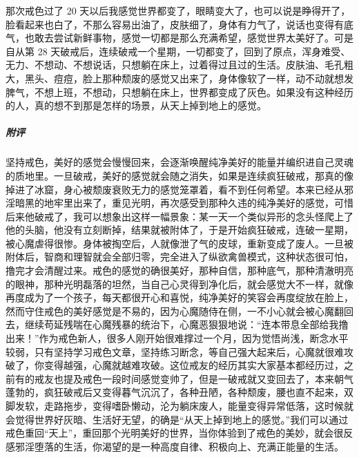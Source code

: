 \begin{case}
    那次戒色过了 20 天以后我感觉世界都变了，眼睛变大了，也可以说是睁得开了，脸看起来也白了，不那么容易出油了，皮肤细了，身体有力气了，说话也变得有底气，也敢去尝试新鲜事物，感觉一切都是那么充满希望，感觉世界太美好了。可是自从第 28 天破戒后，连续破戒一个星期，一切都变了，回到了原点，浑身难受、无力、不想动、不想说话，只想躺在床上，过着得过且过的生活。皮肤油、毛孔粗大，黑头、痘痘，脸上那种颓废的感觉又出来了，身体像软了一样，动不动就想发脾气，不想上班，不想动，只想躺在床上，世界都变成了灰色。如果没有这种经历的人，真的想不到那是怎样的场景，从天上掉到地上的感觉。
    \subparagraph{附评} 坚持戒色，美好的感觉会慢慢回来，会逐渐唤醒纯净美好的能量并编织进自己灵魂的质地里。一旦破戒，美好的感觉就会随之消失，如果是连续疯狂破戒，那真的像掉进了冰窟，身心被颓废衰败无力的感觉笼罩着，看不到任何希望。本来已经从邪淫暗黑的地牢里出来了，重见光明，再次感受到那种久违的纯净美好的感觉，可惜后来他破戒了，我可以想象出这样一幅景象：某一天一个类似异形的念头怪爬上了他的头脑，他没有立刻断掉，结果就被附体了，于是开始疯狂破戒，连破一星期，被心魔虐得很惨。身体被掏空后，人就像泄了气的皮球，重新变成了废人。一旦被附体后，智商和理智就会全部归零，完全进入了纵欲禽兽模式，这种状态很可怕，撸完才会清醒过来。戒色的感觉的确很美好，那种自信，那种底气，那种清澈明亮的眼神，那种光明磊落的坦然，当自己心灵得到净化后，就会感觉大不一样，就像再度成为了一个孩子，每天都很开心和喜悦，纯净美好的笑容会再度绽放在脸上，然而守住戒色的美好感觉是不易的，因为心魔随侍在侧，一不小心就会被心魔翻回去，继续苟延残喘在心魔残暴的统治下，心魔恶狠狠地说：“连本带息全部给我撸出来！”作为戒色新人，很多人刚开始很难撑过一个月，因为觉悟尚浅，断念水平较弱，只有坚持学习戒色文章，坚持练习断念，等自己强大起来后，心魔就很难攻破了，你变得越强，心魔就越难攻破。这位戒友的经历其实大家基本都经历过，之前有的戒友也提及戒色一段时间感觉变帅了，但是一破戒就又变回去了，本来朝气蓬勃的，疯狂破戒后又变得暮气沉沉了，各种丑陋，各种颓废，腰也直不起来，双脚发软，走路拖步，变得嗜卧懒动，沦为躺床废人，能量变得异常低落，这时候就会觉得世界好灰暗、生活好无望，的确是“从天上掉到地上的感觉。”我们可以通过戒色重回“天上”，重回那个光明美好的世界，当你体验到了戒色的美妙，就会很反感邪淫堕落的生活，你渴望的是一种高度自律、积极向上、充满正能量的生活。
\end{case}

